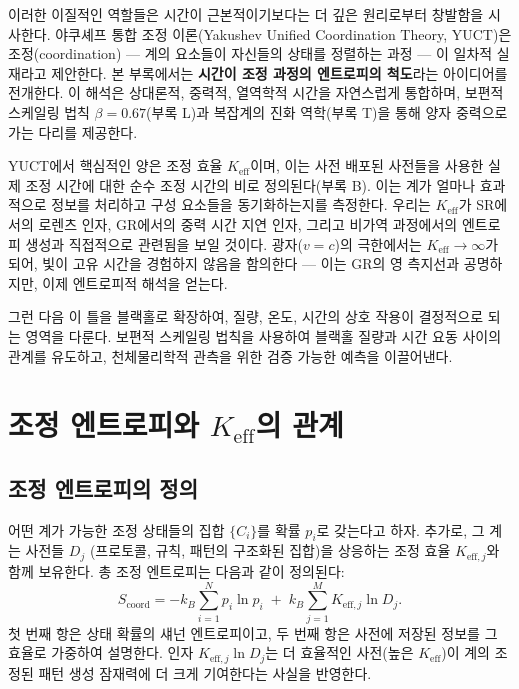 \documentclass[12pt,a4paper]{article}
\newcommand{\Keff}{K_{\mathrm{eff}}}
\newcommand{\Keffi}[1]{K_{\mathrm{eff},#1}}
\newcommand{\Scoord}{S_{\mathrm{coord}}}
\begin{document}
	이러한 이질적인 역할들은 시간이 근본적이기보다는 더 깊은 원리로부터 창발함을 시사한다. 야쿠셰프 통합 조정 이론(Yakushev Unified Coordination Theory, YUCT)은 조정(coordination) — 계의 요소들이 자신들의 상태를 정렬하는 과정 — 이 일차적 실재라고 제안한다. 본 부록에서는 \textbf{시간이 조정 과정의 엔트로피의 척도}라는 아이디어를 전개한다. 이 해석은 상대론적, 중력적, 열역학적 시간을 자연스럽게 통합하며, 보편적 스케일링 법칙 \(\beta = 0.67\)(부록 L)과 복잡계의 진화 역학(부록 T)을 통해 양자 중력으로 가는 다리를 제공한다.
	
	YUCT에서 핵심적인 양은 조정 효율 \(\Keff\)이며, 이는 사전 배포된 사전들을 사용한 실제 조정 시간에 대한 순수 조정 시간의 비로 정의된다(부록 B). 이는 계가 얼마나 효과적으로 정보를 처리하고 구성 요소들을 동기화하는지를 측정한다. 우리는 \(\Keff\)가 SR에서의 로렌츠 인자, GR에서의 중력 시간 지연 인자, 그리고 비가역 과정에서의 엔트로피 생성과 직접적으로 관련됨을 보일 것이다. 광자(\(v=c\))의 극한에서는 \(\Keff \to \infty\)가 되어, 빛이 고유 시간을 경험하지 않음을 함의한다 — 이는 GR의 영 측지선과 공명하지만, 이제 엔트로피적 해석을 얻는다.
	
	그런 다음 이 틀을 블랙홀로 확장하여, 질량, 온도, 시간의 상호 작용이 결정적으로 되는 영역을 다룬다. 보편적 스케일링 법칙을 사용하여 블랙홀 질량과 시간 요동 사이의 관계를 유도하고, 천체물리학적 관측을 위한 검증 가능한 예측을 이끌어낸다.
	
	\section{조정 엔트로피와 \(\Keff\)의 관계}
	\label{sec:coord_entropy}
	
	\subsection{조정 엔트로피의 정의}
	
	어떤 계가 가능한 조정 상태들의 집합 \(\{C_i\}\)를 확률 \(p_i\)로 갖는다고 하자. 추가로, 그 계는 사전들 \(D_j\) (프로토콜, 규칙, 패턴의 구조화된 집합)을 상응하는 조정 효율 \(\Keffi{j}\)와 함께 보유한다. 총 조정 엔트로피는 다음과 같이 정의된다:
	\begin{equation}
		\Scoord = -k_B \sum_{i=1}^{N} p_i \ln p_i \;+\; k_B \sum_{j=1}^{M} \Keffi{j} \ln D_j.
		\label{eq:coord_entropy_def}
	\end{equation}
	첫 번째 항은 상태 확률의 섀넌 엔트로피이고, 두 번째 항은 사전에 저장된 정보를 그 효율로 가중하여 설명한다. 인자 \(\Keffi{j} \ln D_j\)는 더 효율적인 사전(높은 \(\Keff\))이 계의 조정된 패턴 생성 잠재력에 더 크게 기여한다는 사실을 반영한다.
	
\end{document}
